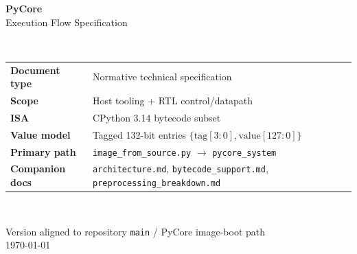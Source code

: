 \documentclass[11pt,a4paper]{article}
\begin{document}
\begin{titlepage}
\centering
\vspace*{1.5cm}
{\Huge\bfseries\color{pcBlue} PyCore}\\[0.4cm]
{\LARGE Execution Flow Specification}\\[1.2cm]
\\[1.5cm]
\begin{tabular}{@{}ll@{}}
  \textbf{Document type} & Normative technical specification \\
  \textbf{Scope}         & Host tooling + RTL control/datapath \\
  \textbf{ISA}           & CPython 3.14 bytecode subset \\
  \textbf{Value model}   & Tagged 132-bit entries $\{\mathrm{tag}[3{:}0],\mathrm{value}[127{:}0]\}$ \\
  \textbf{Primary path}  & \texttt{image\_from\_source.py} $\rightarrow$ \texttt{pycore\_system} \\
  \textbf{Companion docs}& \texttt{architecture.md}, \texttt{bytecode\_support.md},
                           \texttt{preprocessing\_breakdown.md} \\
\end{tabular}\\[2cm]
\vfill
{\large Version aligned to repository \texttt{main} / PyCore image-boot path}\\[0.3cm]
{\normalsize \today}
\end{titlepage}

\tableofcontents
\newpage

\end{document}
